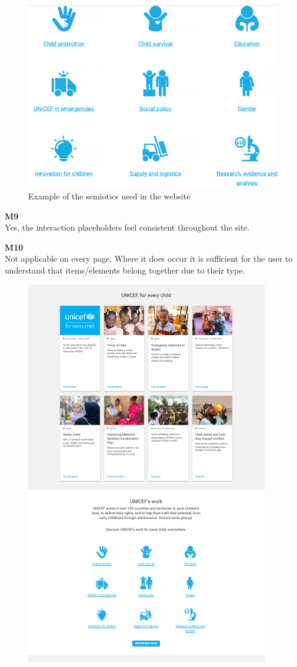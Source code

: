 \begin{description}
\begin{figure}[htp!]
        \includegraphics[scale=0.7]{Resources/Harry/Harry_M8.png}
        \caption{Example of the semiotics used in the website}
    \end{figure}
    \item {\textbf{M9} \color{unicefGray}{Interaction placeholder consistency}}\\
    Yes, the interaction placeholders feel consistent throughout the site. 
    \item {\textbf{M10} \color{unicefGray}{Spatial allocation}}\\
    Not applicable on every page. Where it does occur it is sufficient for the user to understand that items/elements belong together due to their type.
    \begin{figure}[htp!]
        \centering
        \includegraphics[scale=0.8]{Resources/Harry/Harry_M10.png}

\end{figure}
\end{description}
